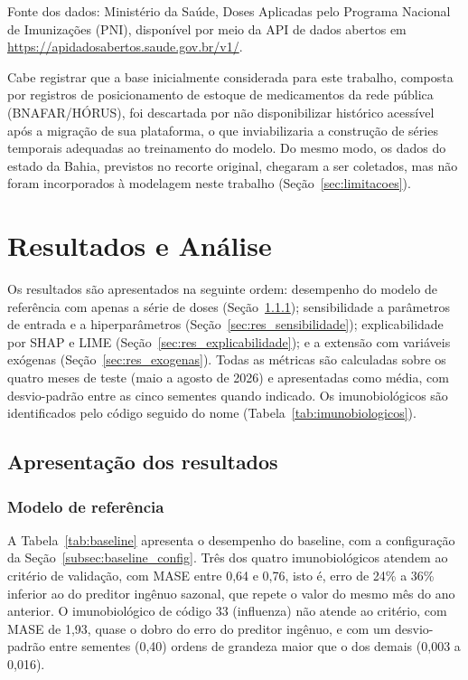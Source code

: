 \documentclass[
    12pt,
    openright,
    oneside,
    a4paper,
    english,
    brazil
]{abntex2}
\begin{document}
Fonte dos dados: Ministério da Saúde, Doses Aplicadas pelo Programa Nacional de Imunizações (PNI), disponível por meio da API de dados abertos em \url{https://apidadosabertos.saude.gov.br/v1/}.

Cabe registrar que a base inicialmente considerada para este trabalho, composta por registros de posicionamento de estoque de medicamentos da rede pública (BNAFAR/HÓRUS), foi descartada por não disponibilizar histórico acessível após a migração de sua plataforma, o que inviabilizaria a construção de séries temporais adequadas ao treinamento do modelo. Do mesmo modo, os dados do estado da Bahia, previstos no recorte original, chegaram a ser coletados, mas não foram incorporados à modelagem neste trabalho (Seção~\ref{sec:limitacoes}).

\chapter{Resultados e Análise}
\label{cap:resultados}

Os resultados são apresentados na seguinte ordem: desempenho do modelo de referência com apenas a série de doses (Seção~\ref{sec:res_baseline}); sensibilidade a parâmetros de entrada e a hiperparâmetros (Seção~\ref{sec:res_sensibilidade}); explicabilidade por SHAP e LIME (Seção~\ref{sec:res_explicabilidade}); e a extensão com variáveis exógenas (Seção~\ref{sec:res_exogenas}). Todas as métricas são calculadas sobre os quatro meses de teste (maio a agosto de 2026) e apresentadas como média, com desvio-padrão entre as cinco sementes quando indicado. Os imunobiológicos são identificados pelo código seguido do nome (Tabela~\ref{tab:imunobiologicos}).

\section{Apresentação dos resultados}

\subsection{Modelo de referência}
\label{sec:res_baseline}

A Tabela~\ref{tab:baseline} apresenta o desempenho do baseline, com a configuração da Seção~\ref{subsec:baseline_config}. Três dos quatro imunobiológicos atendem ao critério de validação, com MASE entre 0,64 e 0,76, isto é, erro de 24\% a 36\% inferior ao do preditor ingênuo sazonal, que repete o valor do mesmo mês do ano anterior. O imunobiológico de código 33 (influenza) não atende ao critério, com MASE de 1,93, quase o dobro do erro do preditor ingênuo, e com um desvio-padrão entre sementes (0,40) ordens de grandeza maior que o dos demais (0,003 a 0,016).
\end{document}
